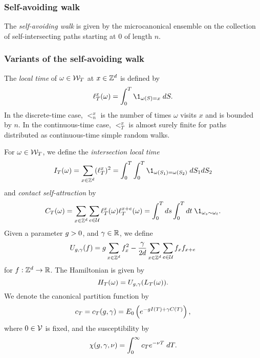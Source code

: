 \subsubsection{Self-avoiding walk}

The \emph{self-avoiding walk} is given by the microcanonical ensemble on the
collection of self-intersecting paths starting at $0$ of length $n$.

\subsubsection{Variants of the self-avoiding walk}

The \emph{local time} of $\omega \in \mathcal{W}_T$ at $x \in { {{\mathbb Z}}^d }$ is defined by
\begin{equation}
\lt^x_T(\omega) = \int_0^T \1_{\omega(S)=x} \; dS.
\end{equation}
In the discrete-time case, $\lt^x_n$ is the number of times $\omega$ visits $x$
and is bounded by $n$. In the continuous-time case, $\lt^x_T$ is almost surely
finite for paths distributed as continuous-time simple random walks.

For $\omega \in \mathcal{W}_T$, we define the \emph{intersection local time}
\begin{equation}
\label{e:ITdef}
I_T(\omega) = \sum_{x\in\Zd} (\lt^x_T)^2 = \int_0^T \int_0^T \1_{\omega(S_1)=\omega(S_2)} \; dS_1 dS_2
\end{equation}
and \emph{contact self-attraction} by
\begin{equation}
\label{e:CTdef}
C_T(\omega) =
  \sum_{x \in \Z^d}\sum_{e\in\Ucal} \lt_T^x(\omega) \lt_T^{x+e}(\omega)
  = \int_0^T ds \int_0^T dt \; \1_{\omega_{s} \sim \omega_{t}}.
\end{equation}
Given a parameter $g > 0$,
and $\gamma \in {\mathbb R}$, we define
\begin{equation}
\label{e:Udef-neg}
U_{g,\gamma}(f)
=
g \sum_{x\in{ {{\mathbb Z}}^d }} f_x^2
- \frac{\gamma}{2d}
\sum_{x\in{ {{\mathbb Z}}^d }} \sum_{e\in\mathcal{U}} f_x f_{x+e}
\end{equation}
for $f : { {{\mathbb Z}}^d } \rightarrow {\mathbb R}$.
The Hamiltonian is given by
\begin{equation}
H_T(\omega) = U_{g,\gamma}(L_T(\omega)).
\end{equation}
We denote the canonical partition function by
\begin{equation}
c_T = c_T(g, \gamma) = E_0 \left( e^{-g I(T) + \gamma C(T)} \right),
\end{equation}
where $0 \in \mathcal{V}$ is fixed,
and the susceptibility by
\begin{equation}
\chi(g, \gamma, \nu) = \int_0^\infty c_T e^{-\nu T} \; dT.
\end{equation}

